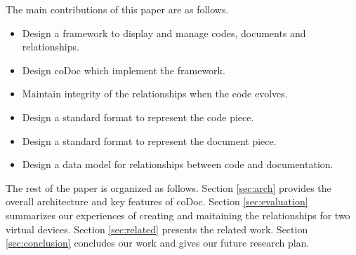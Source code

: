 \documentclass[conference]{IEEEtran}
\begin{document}
The main contributions of this paper are as follows.
\begin{itemize}
\item Design a framework to display and manage codes, documents and relationships.
\item Design coDoc which implement the framework.
\item Maintain integrity of the relationships when the code evolves.
\item Design a standard format to represent the code piece.
\item Design a standard format to represent the document piece.
\item Design a data model for relationships between code and documentation.
\end{itemize}

The rest of the paper is organized as follows. 
Section \ref{sec:arch} provides the overall architecture and key features of coDoc.
Section \ref{sec:evaluation} summarizes our experiences of creating and maitaining the relationships for two virtual devices.
Section \ref{sec:related} presents the related work.
Section \ref{sec:conclusion} concludes our work and gives our future research plan.


%
%

\end{document}
